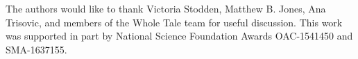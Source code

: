 
\begin{acks}
The authors would like to thank Victoria Stodden, Matthew B. Jones,
Ana Trisovic, and members of the Whole Tale team for useful discussion.
This work was supported in part by National Science Foundation Awards
OAC-1541450 and SMA-1637155.
\end{acks}

